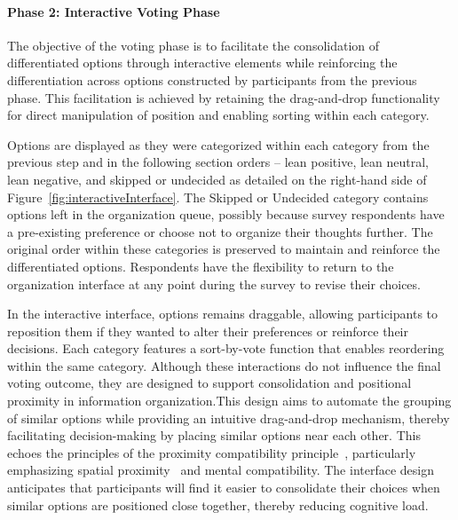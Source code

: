 \paragraph{Phase 2: Interactive Voting Phase}

The objective of the voting phase is to facilitate the consolidation of differentiated options through interactive elements while reinforcing the differentiation across options constructed by participants from the previous phase. This facilitation is achieved by retaining the drag-and-drop functionality for direct manipulation of position and enabling sorting within each category.

Options are displayed as they were categorized within each category from the previous step and in the following section orders -- lean positive, lean neutral, lean negative, and skipped or undecided as detailed on the right-hand side of Figure~\ref{fig:interactiveInterface}. The Skipped or Undecided category contains options left in the organization queue, possibly because survey respondents have a pre-existing preference or choose not to organize their thoughts further. The original order within these categories is preserved to maintain and reinforce the differentiated options. Respondents have the flexibility to return to the organization interface at any point during the survey to revise their choices.

In the interactive interface, options remains draggable, allowing participants to reposition them if they wanted to alter their preferences or reinforce their decisions. Each category features a sort-by-vote function that enables reordering within the same category. Although these interactions do not influence the final voting outcome, they are designed to support consolidation and positional proximity in information organization.This design aims to automate the grouping of similar options while providing an intuitive drag-and-drop mechanism, thereby facilitating decision-making by placing similar options near each other. This echoes the principles of the proximity compatibility principle~\cite{wickens1995proximity}, particularly emphasizing spatial proximity~\cite{wickens1990proximity} and mental compatibility. The interface design anticipates that participants will find it easier to consolidate their choices when similar options are positioned close together, thereby reducing cognitive load.

